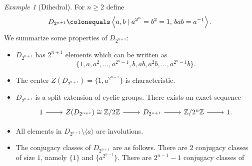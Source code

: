 \documentclass{dcthesis}
\newcommand{\ZZ}{\mathbb Z}
\numberwithin{equation}{section}
\theoremstyle{definition}
\theoremstyle{remark}
\newtheorem{example}[equation]{Example}
\begin{document}
{{{      %
    \begin{example}[Dihedral]
      \label{exm:dihedral}
      For $n\geq 2$ define
      \begin{equation}
        \label{eqn:dihedral}
        D_{2^{n+1}}\colonequals
        \left\langle
          a,b\mid
          a^{2^{n}}=
          b^2=1,
          \,
          bab=a^{-1}
        \right\rangle.
      \end{equation}
      We summarize some properties of
      $D_{2^{n+1}}$:
      \begin{itemize}
        \item
          $D_{2^{n+1}}$ has $2^{n+1}$ elements which can be written as
          \begin{equation}
            \label{eqn:elementsofdihedral}
            \{
              1,a,a^2,\dots,a^{2^n-1},
              b,ab,a^2b,\dots,a^{2^n-1}b
            \}.
          \end{equation}
        \item
          The center
          $Z(D_{2^{n+1}}) = \{1,a^{2^{n-1}}\}$
          is characteristic.
        \item
          $D_{2^{n+1}}$ is a split extension
          of cyclic groups.
          There exists an exact sequence
          \begin{equation}
            \label{eqn:dihedralses}
            \begin{tikzcd}
              1\arrow{r}
              &Z(D_{2^{n+1}})\cong\ZZ/2\ZZ\arrow{r}
              &D_{2^{n+1}}\arrow{r}
              &\ZZ/2^{n}\ZZ\arrow{r}&1.
            \end{tikzcd}
          \end{equation}
        \item
          All elements in
          $D_{2^{n+1}}\setminus\langle a\rangle$
          are involutions.
        \item
          The conjugacy classes of
          $D_{2^{n+1}}$ are as follows.
          There are $2$ conjugacy classes
          of size $1$,
          namely $\{1\}$ and $\{a^{2^{n-1}}\}$.
          There are $2^{n-1}-1$
          conjugacy classes of

\end{itemize}
\end{example}}}}
\end{document}
